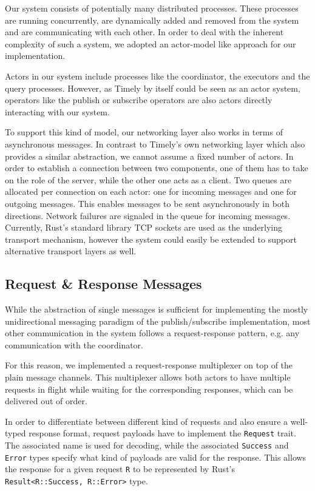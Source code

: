 Our system consists of potentially many distributed processes. These processes
are running concurrently, are dynamically added and removed from the system
and are communicating with each other. In order to deal with the inherent
complexity of such a system, we adopted an actor-model like approach for our
implementation.


Actors in our system include processes like the coordinator, the executors 
and the query processes. However, as Timely by itself could be seen as an
actor system, operators like the publish or subscribe operators are also actors
directly interacting with our system.

To support this kind of model, our networking layer also works in terms of
asynchronous messages. In contrast to Timely's own networking layer which also
provides a similar abstraction, we cannot assume a fixed number of actors.
In order to establish a connection between two components, one of them has to
take on the role of the server, while the other one acts as a client. Two
queues are allocated per connection on each actor: one for incoming messages
and one for outgoing messages. This enables messages to be sent asynchronously
in both directions. Network failures are signaled in the queue for incoming
messages. Currently, Rust's standard library TCP sockets are used as the
underlying transport mechanism, however the system could easily be extended to
support alternative transport layers as well.

\subsection{Request \& Response Messages} \label{sec:reqresp}

While the abstraction of single messages is sufficient for implementing the
mostly unidirectional messaging paradigm of the publish/subscribe implementation,
most other communication in the system follows a request-response pattern,
e.g. any communication with the coordinator.

For this reason, we implemented a request-response multiplexer on
top of the plain message channels. This multiplexer allows both actors to have
multiple requests in flight while waiting for the corresponding responses,
which can be delivered out of order.

In order to differentiate between different kind of requests and also ensure a
well-typed response format, request payloads have to implement the \lstinline{Request}
trait. The associated name is used for decoding, while the associated \lstinline{Success}
and \lstinline{Error} types specify what kind of payloads are valid for the response.
This allows the response for a given request \lstinline{R} to be represented by
Rust's \lstinline{Result<R::Success, R::Error>} type.


